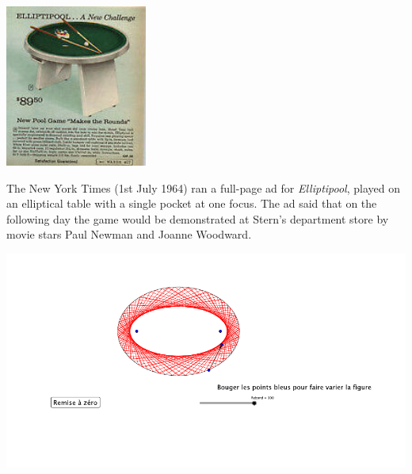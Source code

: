 \documentclass[compress,aspectratio=169,10pt,usenames,dvipsnames]{beamer}
\begin{document}

\begin{frame}
\begin{example}
\begin{center}
\includegraphics[width=0.35\textwidth]{Elliptipool2}
\end{center}

{\small
The New York Times (1st July 1964) ran a full-page ad for \emph{Elliptipool}, played on an elliptical table with a single pocket at one focus. The ad said that on the following day the game would be demonstrated at Stern's department store by movie stars Paul Newman and Joanne Woodward.
}

\end{example}
\end{frame}


\begin{frame}
\begin{example}
\centering 
\includegraphics[scale=2.0]{EllBillEll}
\end{example}
\end{frame}


\end{document}
